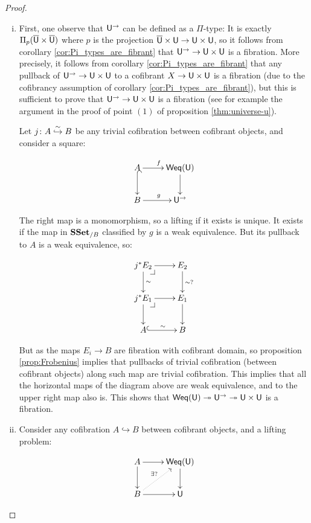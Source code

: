 \documentclass[reqno,10pt,a4paper,oneside,draft]{amsart}
\begin{document}
\begin{proof}
\leavevmode
\begin{enumerate}[(i)]
\item First, one observe that $\mathsf{U}^{\rightarrow}$ can be defined as a $\Pi$-type: It is exactly $\Pi_p(\overline{\mathsf{U}} \times \overline{\mathsf{U}})$ where $p$ is the projection $\overline{\mathsf{U}} \times \mathsf{U} \rightarrow \mathsf{U} \times \mathsf{U}$,
so it follows from corollary \ref{cor:Pi_types_are_fibrant} that $\mathsf{U}^{\rightarrow} \rightarrow \mathsf{U} \times \mathsf{U}$ is a fibration.
More precisely, it follows from corollary  \ref{cor:Pi_types_are_fibrant} that any pullback of  $\mathsf{U}^{\rightarrow} \rightarrow \mathsf{U} \times \mathsf{U}$ to a cofibrant
$X \rightarrow \mathsf{U} \times \mathsf{U}$ is a fibration (due to the cofibrancy assumption of corollary \ref{cor:Pi_types_are_fibrant}),
but this is sufficient to prove that $\mathsf{U}^{\rightarrow} \rightarrow \mathsf{U} \times \mathsf{U}$ is a fibration (see for example the argument
in the proof of point $(1)$ of proposition \ref{thm:universe-u}).

Let $j \colon A \overset{\sim}{\hookrightarrow} B$ be any trivial cofibration between cofibrant objects, and consider a square:

\[ \xymatrix{ A \ar@{^{(}->}[d] \ar[r]^{f} & \mathsf{Weq}(\U) \ar[d] \\
B \ar[r]^{g} & \U^{\rightarrow}
}\]

The right map is a monomorphism, so a lifting if it exists is unique. It exists if the map in $\mathbf{SSet}_{/B}$ classified by $g$ is a weak equivalence. But its pullback to $A$ is a weak equivalence, so:

\[ \xymatrix{ 
j^* E_2 \ar[d]^{\sim} \ar[r] \drpullback & E_2 \ar[d]^{\sim ?} \\
j^* E_1 \ar[r] \ar[d] \drpullback  & E_1 \ar[d] \\
A \ar@{^{(}->}[r]^{\sim} & B \\
}\]

But as the maps $E_i \rightarrow B$ are fibration with cofibrant domain, so proposition \ref{prop:Frobenius} implies that pullbacks of trivial cofibration (between cofibrant objects) along such map are trivial cofibration. This implies that all the horizontal maps of the diagram above are weak equivalence, and to the upper right map also is. This shows that $\mathsf{Weq}(\mathsf{U}) \twoheadrightarrow \mathsf{U}^{\rightarrow} \twoheadrightarrow \mathsf{U} \times \mathsf{U}$ is a fibration.
\item Consider any cofibration $A\hookrightarrow B$ between cofibrant objects, and a lifting problem:

\[\xymatrix{ A \ar[d] \ar[r] & \mathsf{Weq}(\U) \ar[d] \\
B \ar[r] \ar@{.>}[ur]^{\exists ?} & \U 
}\]


\end{enumerate}
\end{proof}
\end{document}
